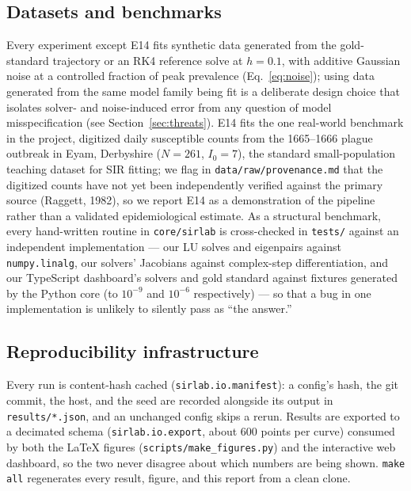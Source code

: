 \subsection{Datasets and benchmarks}
Every experiment except E14 fits synthetic data generated from the gold-standard trajectory or an
RK4 reference solve at $h=0.1$, with additive Gaussian noise at a controlled fraction of peak
prevalence (Eq.~\ref{eq:noise}); using data generated from the same model family being fit is a
deliberate design choice that isolates solver- and noise-induced error from any question of
model misspecification (see Section~\ref{sec:threats}). E14 fits the one real-world benchmark in
the project, digitized daily susceptible counts from the 1665--1666 plague outbreak in Eyam,
Derbyshire ($N=261$, $I_0=7$), the standard small-population teaching dataset for SIR fitting; we
flag in \texttt{data/raw/provenance.md} that the digitized counts have not yet been independently
verified against the primary source (Raggett, 1982), so we report E14 as a demonstration of the
pipeline rather than a validated epidemiological estimate. As a structural benchmark, every
hand-written routine in \texttt{core/sirlab} is cross-checked in \texttt{tests/} against an
independent implementation --- our LU solves and eigenpairs against \texttt{numpy.linalg}, our
solvers' Jacobians against complex-step differentiation, and our TypeScript dashboard's solvers
and gold standard against fixtures generated by the Python core (to $10^{-9}$ and $10^{-6}$
respectively) --- so that a bug in one implementation is unlikely to silently pass as ``the
answer.''

\subsection{Reproducibility infrastructure}
Every run is content-hash cached (\texttt{sirlab.io.manifest}): a config's hash, the git commit,
the host, and the seed are recorded alongside its output in \texttt{results/*.json}, and an
unchanged config skips a rerun. Results are exported to a decimated schema
(\texttt{sirlab.io.export}, about 600 points per curve) consumed by both the LaTeX figures
(\texttt{scripts/make\_figures.py}) and the interactive web dashboard, so the two never disagree
about which numbers are being shown. \texttt{make all} regenerates every result, figure, and this
report from a clean clone.
